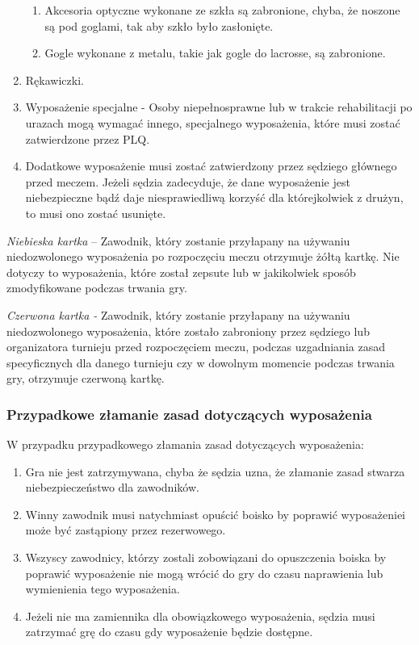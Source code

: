 \documentclass[12pt]{article}
\begin{document}
\begin{enumerate}
	      \begin{enumerate}
		      \item
		            Akcesoria optyczne wykonane ze szkła są zabronione, chyba, że
		            noszone są pod goglami, tak aby szkło było zasłonięte.
		      \item
		            Gogle wykonane z metalu, takie jak gogle do lacrosse, są zabronione.
	      \end{enumerate}
	\item
	      Rękawiczki.
	\item
	      Wyposażenie specjalne - Osoby niepełnosprawne lub w trakcie
	      rehabilitacji po urazach mogą wymagać innego, specjalnego wyposażenia,
	      które musi zostać zatwierdzone przez PLQ.
	\item
	      Dodatkowe wyposażenie musi zostać zatwierdzony przez sędziego
	      głównego przed meczem. Jeżeli sędzia zadecyduje, że dane wyposażenie
	      jest niebezpieczne bądź daje niesprawiedliwą korzyść dla którejkolwiek
	      z drużyn, to musi ono zostać usunięte.
\end{enumerate}

\emph{Niebieska kartka} -- Zawodnik, który zostanie przyłapany na
używaniu niedozwolonego wyposażenia po rozpoczęciu meczu otrzymuje żółtą
kartkę. Nie dotyczy to wyposażenia, które został zepsute lub w
jakikolwiek sposób zmodyfikowane podczas trwania gry.

\emph{Czerwona kartka -} Zawodnik, który zostanie przyłapany na używaniu
niedozwolonego wyposażenia, które zostało zabroniony przez sędziego lub
organizatora turnieju przed rozpoczęciem meczu, podczas uzgadniania
zasad specyficznych dla danego turnieju czy w dowolnym momencie podczas
trwania gry, otrzymuje czerwoną kartkę.

\subsubsection{Przypadkowe złamanie zasad dotyczących wyposażenia}
W przypadku przypadkowego złamania zasad dotyczących wyposażenia:

\begin{enumerate}
	\item
	      Gra nie jest zatrzymywana, chyba że sędzia uzna, że złamanie zasad
	      stwarza niebezpieczeństwo dla zawodników.
	\item
	      Winny zawodnik musi natychmiast opuścić boisko by poprawić
	      wyposażeniei może być zastąpiony przez rezerwowego.
	\item
	      Wszyscy zawodnicy, którzy zostali zobowiązani do opuszczenia boiska by
	      poprawić wyposażenie nie mogą wrócić do gry do czasu naprawienia lub
	      wymienienia tego wyposażenia.
	\item
	      Jeżeli nie ma zamiennika dla obowiązkowego wyposażenia, sędzia musi
	      zatrzymać grę do czasu gdy wyposażenie będzie dostępne.
\end{enumerate}
\end{document}
